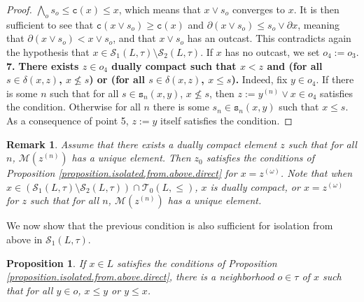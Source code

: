 \documentclass{article}
\newcommand{\comm}[2]{\begin{tcolorbox}[colback=gray!40]\textbf{Comment} (#1) : #2\end{tcolorbox}}
\newtheorem{proposition}[theorem]{Proposition}
\newtheorem{remark}[theorem]{Remark}
\begin{document}
\begin{proof}
    $\bigwedge_o s_o \le \texttt{c}(x) \le x$, which means that 
    $x \vee s_o$ converges to $x$. It is then sufficient to see that $\texttt{c}(x\vee s_o) \ge \texttt{c}(x)$ and $\partial (x \vee s_o) \le s_o \vee \partial x$, meaning that 
    $\partial (x \vee s_o) < x \vee s_o$, and that $x \vee s_o$ has an outcast. This contradicts again the hypothesis that 
    $x \in \mathcal{S}_1(L,\tau) \setminus \mathcal{S}_2(L,\tau)$.
    If $x$ has no outcast, we set $o_4 := o_3$.
    \textbf{7.} \textbf{There exists $z \in o_4$ dually compact such that $x < z$ and (for all $s \in \delta(x,z)$, $x \not \le s$) or (for all $s \in \delta(x,z)$, $x \le s$).} 
    Indeed, fix $y \in o_4$. If there is some $n$ such that 
    for all $s \in \texttt{s}_n(x,y)$, $x \not \le s$, then $z:= y^{(n)} \vee x \in o_4$ satisfies the condition. Otherwise for all $n$ there is some $s_n \in \texttt{s}_n(x,y)$ such that $x \le s$. As a consequence of point 5, $z:=y$ itself satisfies the condition. 
\end{proof}

\begin{remark}
    Assume that there exists a dually compact element $z$ such that for all $n$, $\mathcal{M}(z^{(n)})$ has a unique element. Then $z_0$ satisfies the conditions of Proposition \ref{proposition.isolated.from.above.direct} for $x = z^{(\omega)}$. Note that when $x \in (\mathcal{S}_1(L,\tau) \setminus \mathcal{S}_2(L,\tau)) \cap \mathcal{T}_0(L,\le)$,
    $x$ is dually compact, or $x = z^{(\omega)}$ for $z$ such that for all $n$, $\mathcal{M}(z^{(n)})$ has a unique element.
\end{remark}

{
We now show that the previous condition is also sufficient for isolation from above in $\mathcal{S}_1(L,\tau)$.}


\begin{proposition}\label{proposition.comparable.neighborhood}
    {If $x \in L$ satisfies the conditions of Proposition \ref{proposition.isolated.from.above.direct}, there is a neighborhood $o\in \tau$ of $x$ such that 
     for all $y \in o$, $x \le y$ or $y \le x$.}
\end{proposition}
\end{document}
